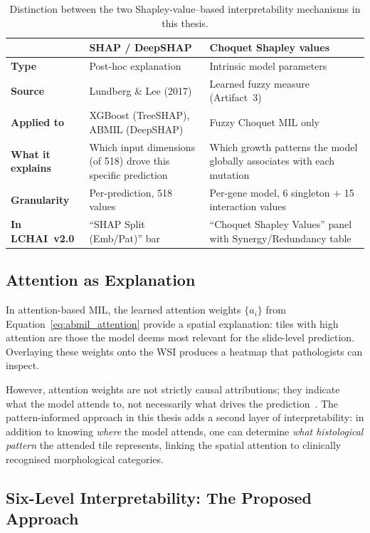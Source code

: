 \begin{table}[ht!]
\centering
\small
\caption{Distinction between the two Shapley-value--based
interpretability mechanisms in this thesis.}
\label{tab:shapley_distinction}
\begin{tabular}{p{3cm} p{5.5cm} p{5.5cm}}
\hline
& \textbf{SHAP / DeepSHAP} & \textbf{Choquet Shapley values} \\
\hline
\textbf{Type} & Post-hoc explanation & Intrinsic model parameters \\
\textbf{Source} & Lundberg \& Lee (2017) & Learned fuzzy measure (Artifact~3) \\
\textbf{Applied to} & XGBoost (TreeSHAP), ABMIL (DeepSHAP) & Fuzzy Choquet MIL only \\
\textbf{What it explains} & Which input dimensions (of 518) drove this specific prediction & Which growth patterns the model globally associates with each mutation \\
\textbf{Granularity} & Per-prediction, 518 values & Per-gene model, 6 singleton $+$ 15 interaction values \\
\textbf{In LCHAI~v2.0} & ``SHAP Split (Emb/Pat)'' bar & ``Choquet Shapley Values'' panel with Synergy/Redundancy table \\
\hline
\end{tabular}
\end{table}

\subsection{Attention as Explanation}
\label{sec:bg:attention_xai}

In attention-based MIL, the learned attention weights $\{a_i\}$ from Equation~\ref{eq:abmil_attention} provide a spatial explanation: tiles with high attention are those the model deems most relevant for the slide-level prediction.
Overlaying these weights onto the WSI produces a heatmap that pathologists can inspect.

However, attention weights are not strictly causal attributions; they indicate what the model attends to, not necessarily what drives the prediction~\cite{jain2019attention}.
The pattern-informed approach in this thesis adds a second layer of interpretability: in addition to knowing \emph{where} the model attends, one can determine \emph{what histological pattern} the attended tile represents, linking the spatial attention to clinically recognised morphological categories.

\subsection{Six-Level Interpretability: The Proposed Approach}
\label{sec:bg:dual_interpretability}


